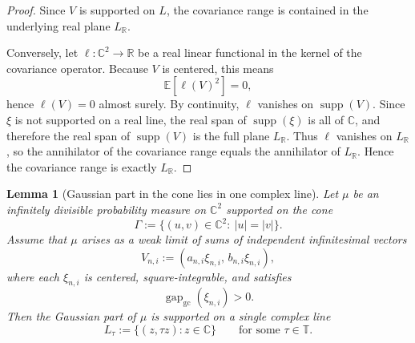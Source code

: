 \documentclass[11pt]{amsart}
\newtheorem{lemma}[theorem]{Lemma}
\newcommand{\E}{\mathbb{E}}
\newcommand{\C}{\mathbb{C}}
\newcommand{\R}{\mathbb{R}}
\newcommand{\T}{\mathbb{T}}
\newcommand{\supp}{\operatorname{supp}}
\newcommand{\gapgc}{\operatorname{gap}_{\mathrm{gc}}}
\begin{document}
\begin{proof}
Since $V$ is supported on $L$, the covariance range is contained in the
underlying real plane $L_\R$.

Conversely, let $\ell:\C^2\to\R$ be a real linear functional in the kernel of
the covariance operator.  Because $V$ is centered, this means
\[
  \E[\ell(V)^2]=0,
\]
hence $\ell(V)=0$ almost surely.  By continuity, $\ell$ vanishes on
$\supp(V)$.  Since $\xi$ is not supported on a real line, the real span of
$\supp(\xi)$ is all of $\C$, and therefore the real span of $\supp(V)$ is the
full plane $L_\R$.  Thus $\ell$ vanishes on $L_\R$, so the annihilator of the
covariance range equals the annihilator of $L_\R$.  Hence the covariance range
is exactly $L_\R$.
\end{proof}

\begin{lemma}[Gaussian part in the cone lies in one complex line]
\label{lem:gaussian-one-slope}
Let $\mu$ be an infinitely divisible probability measure on $\C^2$ supported on
the cone
\[
  \Gamma:=\{(u,v)\in\C^2:\ |u|=|v|\}.
\]
Assume that $\mu$ arises as a weak limit of sums of independent infinitesimal
vectors
\[
  V_{n,i}:=(a_{n,i}\xi_{n,i},\,b_{n,i}\xi_{n,i}),
\]
where each $\xi_{n,i}$ is centered, square-integrable, and satisfies
\[
  \gapgc(\xi_{n,i})>0.
\]
Then the Gaussian part of $\mu$ is supported on a single complex line
\[
  L_\tau:=\{(z,\tau z): z\in\C\}
  \qquad\text{for some } \tau\in\T.
\]
\end{lemma}
\end{document}
